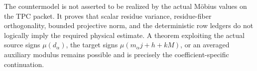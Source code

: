 \begin{remark}
\label{rem:tpc42-countermodel-boundary}
The countermodel is not asserted to be realized by the actual M\"obius
values on the TPC packet.  It proves that scalar residue variance,
residue-fiber orthogonality, bounded projective norm, and the deterministic
row ledgers do not logically imply the required physical estimate.  A
theorem exploiting the actual source signs \(\mu(d_\alpha)\), the target
signs \(\mu(m_\alpha j+h+kM)\), or an averaged auxiliary modulus remains
possible and is precisely the coefficient-specific continuation.
\end{remark}
